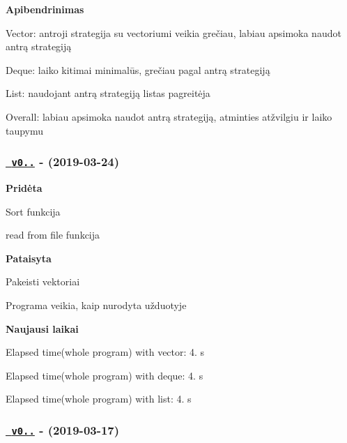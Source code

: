 {\bfseries{Apibendrinimas}}


\begin{DoxyItemize}
\item Vector\+: antroji strategija su vectoriumi veikia grečiau, labiau apsimoka naudot antrą strategiją
\item Deque\+: laiko kitimai minimalūs, grečiau pagal antrą strategiją
\item List\+: naudojant antrą strategiją listas pagreitėja
\item Overall\+: labiau apsimoka naudot antrą strategiją, atminties atžvilgiu ir laiko taupymu
\end{DoxyItemize}

\subsubsection*{\href{https://github.com/ToNyHasK/VUObjektinisNO2/releases/tag/v0.5.2}{\texttt{ v0..}} -\/ (2019-\/03-\/24)}

{\bfseries{Pridėta}}


\begin{DoxyItemize}
\item Sort funkcija
\item read from file funkcija
\end{DoxyItemize}

{\bfseries{Pataisyta}}


\begin{DoxyItemize}
\item Pakeisti vektoriai
\item Programa veikia, kaip nurodyta užduotyje
\end{DoxyItemize}

{\bfseries{Naujausi laikai}}


\begin{DoxyItemize}
\item Elapsed time(whole program) with vector\+: 4. s
\item Elapsed time(whole program) with deque\+: 4. s
\item Elapsed time(whole program) with list\+: 4. s
\end{DoxyItemize}

\subsubsection*{\href{https://github.com/ToNyHasK/VUObjektinisNO2/releases/tag/v0.5.1}{\texttt{ v0..}} -\/ (2019-\/03-\/17)}

